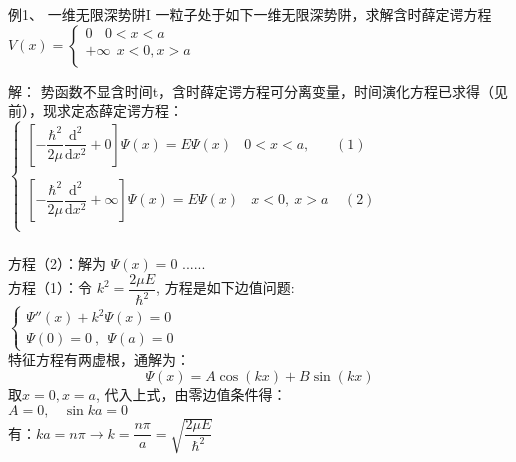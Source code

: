 \begin{frame}
	\frametitle{}
	\begin{exampleblock} {例1、	一维无限深势阱I}
	一粒子处于如下一维无限深势阱，求解含时薛定谔方程\\
 	{ $ \displaystyle 
	V(x)=\left \{ 
	\begin{array}{cccc}
		0	~~ ~~ 0<x<a \\  
		+\infty ~~x<0, x>a\\
	\end{array}
	\right.
	$} \\
	\end{exampleblock} %
	\alert{解：} 	势函数不显含时间t，含时薛定谔方程可分离变量，时间演化方程已求得（见前），现求定态薛定谔方程：\\
	{  $ \displaystyle 
	\left \{ 
	\begin{array}{cccc}
		\left [ -\dfrac{\hbar^2}{2\mu} \dfrac{\mathrm{d} ^2}{\mathrm{d} x^2} +0 \right ]\Psi(x)=E\Psi(x)  ~~ ~~ 0<x<a,~~~~~~~~ (1)  \\ 
		\\	
		\left [ -\dfrac{\hbar^2}{2\mu} \dfrac{\mathrm{d} ^2}{\mathrm{d} x^2} +\infty \right ]\Psi(x)=E\Psi(x)  ~~ ~~ x<0,~ x>a ~~~~~(2)  \\
	\end{array}
	\right.
	$} \\
\end{frame}

\begin{frame}
	\frametitle{}
	方程（2）：解为  $\Psi(x) = 0$ ......\\ 
    方程（1）：令 $ k^2= \dfrac{2\mu E}{\hbar ^2} $, 方程是如下边值问题:  \\ 
	{ $ \displaystyle 
		\begin{cases}
			\Psi''(x) + k^2	\Psi(x)=0  \\
			\Psi(0)=0~,~~ \Psi(a)=0 ~~~~~
		\end{cases}
		$} \\  \vspace{0.3cm}
    特征方程有两虚根，通解为：\\
     	\begin{equation*}
  			\Psi(x) = A\cos(kx) +B\sin(kx) 
    	\end{equation*}
    取$x=0, x=a$,  代入上式，由零边值条件得：\\
   	\hspace{2cm} $A=0, ~~~~ \sin ka =0$  \\  \vspace{0.3cm}
	有：$ka=n\pi  \to  k=\dfrac{n\pi}{a} = \sqrt{\dfrac{2\mu E}{\hbar ^2}}$    \\ 
\end{frame}

